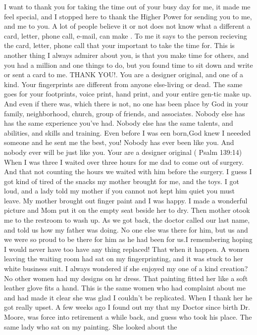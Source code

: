 \documentclass[a1paper]{article}
\begin{document}
\begin{multicols}{7}
{I want to thank you for taking the time out of your busy day for me, it made me feel special, and
I stopped here to thank the Higher Power for sending you to me, and me to you. A lot of people believe
it or not does not know what a different a card, letter, phone call, e-mail, can make . To me it says to
the person recieving the card, letter, phone call that your important to take the time for.    This is
another thing I always admirer about you, is that you make time for others, and you had a million and one
things to do, but you found time to sit down and write or sent a card to me. THANK YOU!.
    You are a designer original, and one of a kind. Your fingerprints are different from anyone else-living
or dead. The same goes for your footprints, voice print, hand print, and your entire gen-tic make up.
And even if there was, which there is not, no one has been place by God in your family, neighborhood,
church, group of friends, and associates. Nobody else has has the same experience you've had. Nobody
else has the same talents, and abilities, and skills and training. Even before I was een born,God knew
I neeeded someone and he sent me the best, you!    Nobody has ever been like you. And nobody ever
will be just like you. Your are a designer original ( Psalm 139:14)
   When I was three I waited over three  hours for me dad to come out of surgery. And
that not counting the hours we waited with him before the surgery. I guess I got kind of  tired of the
snacks my mother brought for me, and the toys. I got loud, and a lady told my mother if you cannot not
kept him quiet you must leave. My mother brought out finger paint and I was happy. I made a
wonderful picture and Mom put it on the empty seat beside her to dry. Then mother otook me to the
restroom to wash up. As we got back, the doctor called our last name, and told us how my father was
doing. No one else was there for him, but us and we were so  proud to be there for him as he had been
for us.I remembering  hoping I would never have too have any thing replaced!
   That when it happen. A women leaving the waiting room had sat on my fingerprinting, and it was
stuck to her white business suit. I always wondered if she enjoyed my one of a kind creation? No other
women had my designs on hr dress. That painting fitted her like a soft leather glove fits a hand.
   This is the same women who had complaint about me and had made it clear she was glad I couldn't
be replicated. When I thank her he got really upset.
   A few weeks ago I found out my that my Doctor since birth  Dr. Moore, was force into retirement a
while back, and guess who took his place. The same lady who sat on my painting. She looked about the
}
\end{multicols}
\end{document}
